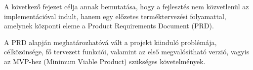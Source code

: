 A következő fejezet célja annak bemutatása, hogy a fejlesztés nem közvetlenül az implementációval indult, hanem egy előzetes terméktervezési folyamattal, amelynek központi eleme a Product Requirements Document (PRD).

A PRD alapján meghatározhatóvá vált a projekt kiinduló problémája, célközönsége, fő tervezett funkciói, valamint az első megvalósítható verzió, vagyis az MVP-hez (Minimum Viable Product) szükséges követelmények.











